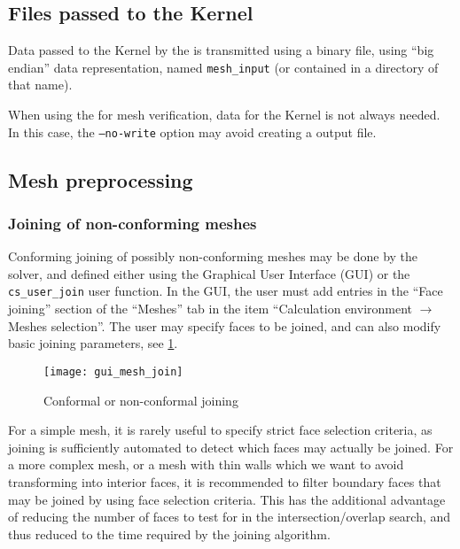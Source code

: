 {{{\subsection{Files passed to the Kernel\label{sec:pcs:mode_comm}}

Data passed to the Kernel by the \pcs is transmitted using a
binary file, using ``big endian'' data representation, named
\texttt{mesh\_input} (or contained in a directory of that name).

When using the \pcs for mesh verification, data for the Kernel
is not always needed. In this case, the \texttt{--no-write} option may
avoid creating a \pcs output file.

\subsection{Mesh preprocessing%
\label{sec:prepro}}

\subsubsection{Joining of non-conforming meshes}\label{sec:optpcs:join}

Conforming joining of possibly non-conforming meshes may be done by the
solver, and defined either using the Graphical User Interface (GUI) or the
\texttt{cs\_user\_join} user function. In the GUI, the user must
add entries in the ``Face joining'' section of the ``Meshes'' tab in the item
``Calculation environment $\rightarrow$ Meshes selection''.
The user may specify faces to be joined, and can also modify basic joining
parameters, see \figurename\ref{fig:joining}.
%
\begin{figure}[!h]
\begin{center}
\texttt{[image: gui\_mesh\_join]}
\caption{Conformal or non-conformal joining}
\label{fig:joining}
\end{center}
\end{figure}
%
For a simple mesh, it is rarely useful to specify strict face selection
criteria, as joining is sufficiently automated to detect which faces
may actually be joined. For a more complex mesh, or a mesh with thin
walls which we want to avoid transforming into interior faces, it is
recommended to filter boundary faces that may be joined by using
face selection criteria. This has the
additional advantage of reducing the number of faces to test for
in the intersection/overlap search, and thus reduced to the time
required by the joining algorithm.

}}}
